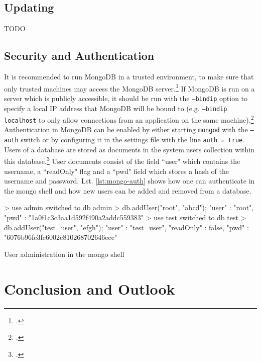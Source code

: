 \subsection{Updating}
\label{sec:maintenance-updating}
TODO

\subsection{Security and Authentication}
\label{sec:maintenance-security}
It is recommended to run MongoDB in a trusted environment, to make sure that
only trusted machines may access the MongoDB
server.\footcite[Cf.][118]{Chodorow_2010}
If MongoDB is run on a server which is publicly accessible, it should be
run with the \texttt{--bindip} option to specify a local IP address that MongoDB
will be bound to (e.g. \texttt{--bindip localhost} to only allow
connections from an application on the same
machine).\footcite[Cf.][118]{Chodorow_2010}
Authentication in MongoDB can be enabled by either starting \texttt{mongod} with the \texttt{--auth} switch or by configuring it in the settings file with the line \texttt{auth = true}.
Users of a database are stored as documents in the system.users collection
within this database.\footcite[Cf.][TODO]{mongo_authentication}
User documents consist of the field ``user" which contains the username,
a ``readOnly" flag and a ``pwd" field which stores a hash of the
username and password. Lst. \ref{lst:mongo-auth} shows how one can
authenticate in the mongo shell and how new users can be added and removed from
a database.

\begin{listing}
    \begin{javascriptcode}
> use admin
switched to db admin
> db.addUser("root", "abcd");
{
"user" : "root",
"pwd" : "1a0f1c3c3aa1d592f490a2addc559383"
}
> use test
switched to db test
> db.addUser("test_user", "efgh");
{
"user" : "test_user",
"readOnly" : false,
"pwd" : "6076b96fc3fe6002c810268702646eec"
}
    \end{javascriptcode}
    \caption{User administration in the mongo shell}
    \label{lst:mongo-auth}
\end{listing}



\newpage
\section{Conclusion and Outlook}
\label{sec:conclusion}

